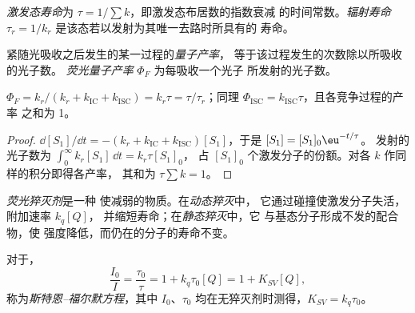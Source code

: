 \begin{definition}\label{def:b3:electronic-spectroscopy:lifetime}
\emph{激发态寿命}为 $\tau =
1/\sum k$，即激发态布居数的指数衰减
的时间常数。\emph{辐射寿命} $\tau_r =
1/k_r$ 是该态若以发射为其唯一去路时所具有的
寿命。
\end{definition}

\begin{definition}[量子产率]\label{def:b3:electronic-spectroscopy:quantum-yield}
紧随光吸收之后发生的某一过程的\emph{量子产率}，
等于该过程发生的次数除以所吸收的光子数。
\emph{荧光量子产率} $\Phi_F$
为每吸收一个光子
所发射的光子数。
\end{definition}

\begin{proposition}[量子产率与寿命]\label{prop:b3:electronic-spectroscopy:quantum-yield}
$\Phi_F = k_r/(k_r + k_{\mathrm{IC}} + k_{\mathrm{ISC}}) = k_r\tau = \tau/\tau_r$；同理
$\Phi_{\mathrm{ISC}} = k_{\mathrm{ISC}}\tau$，且各竞争过程的产率
之和为 1。
\end{proposition}

\begin{proof}
$\dd[S_1]/\dd t = -(k_r + k_{\mathrm{IC}} + k_{\mathrm{ISC}})[S_1]$，于是 $[S_1] = [S_1]_0\eu^{-t/\tau}$。
发射的光子数为 $\int_0^\infty k_r[S_1]\,\dd t = k_r\tau[S_1]_0$，
占 $[S_1]_0$ 个激发分子的份额。对各 $k$ 作同样的积分即得各产率，
其和为 $\tau\sum k = 1$。
\end{proof}

\begin{definition}\label{def:b3:electronic-spectroscopy:quencher}
\emph{荧光猝灭剂}是一种
使减弱的物质。在\emph{动态猝灭}中，
它通过碰撞使激发分子失活，附加速率 $k_q[Q]$，
并缩短寿命；在\emph{静态猝灭}中，它
与基态分子形成不发的配合物，使
强度降低，而仍在的分子的寿命不变。
\end{definition}

\begin{theorem}\label{thm:b3:electronic-spectroscopy:stern-volmer}
对于，
\[
\frac{I_0}{I} = \frac{\tau_0}{\tau} = 1 + k_q\tau_0[Q] = 1 + K_{SV}[Q],
\]
称为\emph{斯特恩–福尔默方程}，其中 $I_0$、$\tau_0$
均在无猝灭剂时测得，$K_{SV} = k_q\tau_0$。
\end{theorem}

